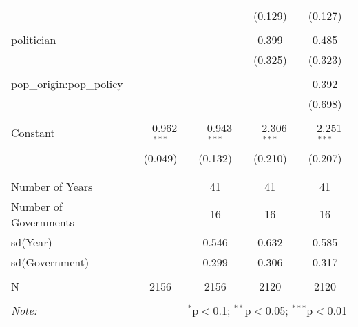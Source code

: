 \begin{table}[!htbp]
\begin{tabular}{@{\extracolsep{5pt}}lcccc}
  &  &  & (0.129) & (0.127) \\ 
  & & & & \\ 
 politician &  &  & 0.399 & 0.485 \\ 
  &  &  & (0.325) & (0.323) \\ 
  & & & & \\ 
 pop\_origin:pop\_policy &  &  &  & 0.392 \\ 
  &  &  &  & (0.698) \\ 
  & & & & \\ 
 Constant & $-$0.962$^{***}$ & $-$0.943$^{***}$ & $-$2.306$^{***}$ & $-$2.251$^{***}$ \\ 
  & (0.049) & (0.132) & (0.210) & (0.207) \\ 
  & & & & \\ 
\hline \\[-1.8ex] 
Number of Years &  & 41 & 41 & 41 \\ 
Number of Governments &  & 16 & 16 & 16 \\ 
sd(Year) &  & 0.546 & 0.632 & 0.585 \\ 
sd(Government) &  & 0.299 & 0.306 & 0.317 \\ 
 &  &  &  &  \\ 
N & 2156 & 2156 & 2120 & 2120 \\ 
\hline 
\hline \\[-1.8ex] 
\textit{Note:}  & \multicolumn{4}{r}{$^{*}$p$<$0.1; $^{**}$p$<$0.05; $^{***}$p$<$0.01} \\ 
\end{tabular} 
\end{table} 
